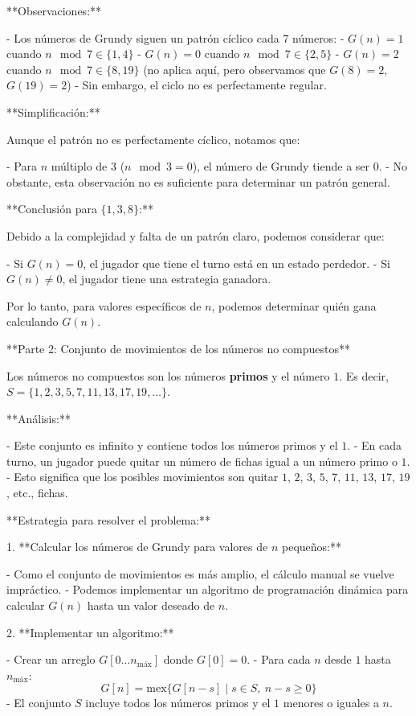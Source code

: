 \documentclass[11pt]{scrartcl}
\begin{document}
\begin{problem}
\begin{hint}
\begin{solu}
**Observaciones:**

- Los números de Grundy siguen un patrón cíclico cada 7 números:
  - $G(n) = 1$ cuando $n \mod 7 \in \{1, 4\}$
  - $G(n) = 0$ cuando $n \mod 7 \in \{2, 5\}$
  - $G(n) = 2$ cuando $n \mod 7 \in \{8, 19\}$ (no aplica aquí, pero observamos que $G(8) = 2$, $G(19) = 2$)
  - Sin embargo, el ciclo no es perfectamente regular.

**Simplificación:**

Aunque el patrón no es perfectamente cíclico, notamos que:

- Para $n$ múltiplo de 3 ($n \mod 3 = 0$), el número de Grundy tiende a ser $0$.
- No obstante, esta observación no es suficiente para determinar un patrón general.

**Conclusión para $\{1, 3, 8\}$:**

Debido a la complejidad y falta de un patrón claro, podemos considerar que:

- Si $G(n) = 0$, el jugador que tiene el turno está en un estado perdedor.
- Si $G(n) \neq 0$, el jugador tiene una estrategia ganadora.

Por lo tanto, para valores específicos de $n$, podemos determinar quién gana calculando $G(n)$.

**Parte 2: Conjunto de movimientos de los números no compuestos**

Los números no compuestos son los números \textbf{primos} y el número $1$. Es decir, $S = \{1, 2, 3, 5, 7, 11, 13, 17, 19, \dots\}$.

**Análisis:**

- Este conjunto es infinito y contiene todos los números primos y el $1$.
- En cada turno, un jugador puede quitar un número de fichas igual a un número primo o $1$.
- Esto significa que los posibles movimientos son quitar $1$, $2$, $3$, $5$, $7$, $11$, $13$, $17$, $19$, etc., fichas.

**Estrategia para resolver el problema:**

1. **Calcular los números de Grundy para valores de $n$ pequeños:**

   - Como el conjunto de movimientos es más amplio, el cálculo manual se vuelve impráctico.
   - Podemos implementar un algoritmo de programación dinámica para calcular $G(n)$ hasta un valor deseado de $n$.

2. **Implementar un algoritmo:**

   - Crear un arreglo $G[0 \ldots n_{\text{máx}}]$ donde $G[0] = 0$.
   - Para cada $n$ desde $1$ hasta $n_{\text{máx}}$:
     \[
     G[n] = \text{mex}\{ G[n - s] \mid s \in S,\ n - s \geq 0 \}
     \]
   - El conjunto $S$ incluye todos los números primos y el $1$ menores o iguales a $n$.


\end{solu}
\end{hint}
\end{problem}
\end{document}
